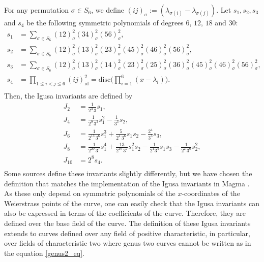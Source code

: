 \documentclass{amsart}
\numberwithin{equation}{section}
\theoremstyle{definition}
\theoremstyle{remark}
\begin{document}
For any permutation $\sigma\in S_6$, we define $(ij)_\sigma:=(\lambda_{\sigma(i)}-\lambda_{\sigma(j)})$. Let $s_1,s_2,s_3$ and $s_4$ be the following symmetric polynomials of degrees $6$, $12$, $18$ and $30$:
\begin{align*}
s_1&= \sum_{\sigma\in S_6}(12)^2_\sigma(34)_\sigma^2(56)^2_\sigma,\\
s_2&=\sum_{\sigma\in S_6}(12)^2_\sigma(13)^2_\sigma(23)_\sigma^2(45)_\sigma^2(46)^2_\sigma(56)^2_\sigma,\\
s_3&=\sum_{\sigma\in S_6}(12)^2_\sigma(13)^2_\sigma(14)^2_\sigma(23)_\sigma^2(25)_\sigma^2(36)_\sigma^2(45)_\sigma^2(46)^2_\sigma(56)^2_\sigma,\\
s_4&=\prod_{1\leq i<j\leq6}(ij)_{\mathrm{id}}^2=\mathrm{disc}\Big(\prod_{i=1}^6(x-\lambda_i)\Big).\\
\end{align*}
Then, the Igusa invariants are defined by
\begin{align*}
J_2&=\tfrac{1}{2^3\, 3} s_1,\\
J_4&=\tfrac{1}{2^9\, 3^3} s_1^2-\tfrac{1}{3^3}s_2,\\
J_6&=\tfrac{1}{2^{13}\, 3^6} s_1^3+\tfrac{5}{2^{4}\, 3^6}s_1 s_2-\tfrac{2^4}{3^3}s_3,\\
J_8&=\tfrac{1}{2^{20}\, 3^7}s_1^4+\tfrac{13}{2^{10}\, 3^7}s_1^2 s_2-\tfrac{1}{2^1 3^4}s_1s_3-\tfrac{1}{2^{2}\, 3^6}s_2^2,\\
J_{10}&=2^8 s_4.\\
\end{align*}
Some sources define these invariants slightly differently, but we have chosen the definition that matches the implementation of the Igusa invariants in Magma \cite{Mestre1991ConstructionModules}.\\

As these only depend on symmetric polynomials of the $x$-coordinates of the Weierstrass points of the curve, one can easily check that the Igusa invariants can also be expressed in terms of the coefficients of the curve. Therefore, they are defined over the base field of the curve. The definition of these Igusa invariants extends to curves defined over any field of positive characteristic, in particular, over fields of characteristic two where genus two curves cannot be written as in the equation \ref{genus2_eq}.\\
\end{document}
